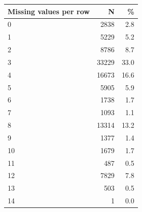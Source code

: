 \begin{threeparttable}


\begin{tabular}{@{}lrr@{}}


\toprule


\textbf{Missing values per row} & \textbf{N} & \textbf{\%} \\


\midrule


\midrule
0           &        2838&         2.8\\
1           &        5229&         5.2\\
2           &        8786&         8.7\\
3           &       33229&        33.0\\
4           &       16673&        16.6\\
5           &        5905&         5.9\\
6           &        1738&         1.7\\
7           &        1093&         1.1\\
8           &       13314&        13.2\\
9           &        1377&         1.4\\
10          &        1679&         1.7\\
11          &         487&         0.5\\
12          &        7829&         7.8\\
13          &         503&         0.5\\
14          &           1&         0.0\\
\bottomrule


\end{tabular}


\end{threeparttable}
